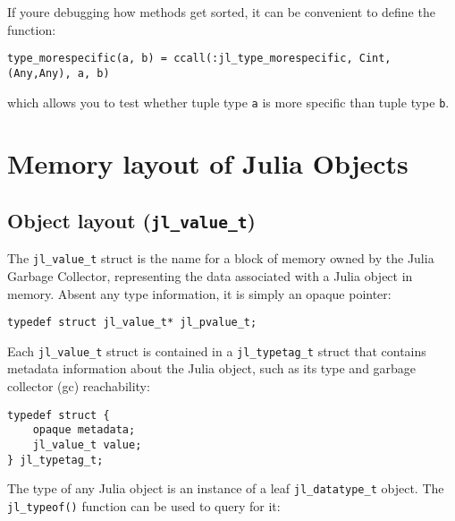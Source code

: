 If you{\textquotesingle}re debugging how methods get sorted, it can be convenient to define the function:




\begin{verbatim}
type_morespecific(a, b) = ccall(:jl_type_morespecific, Cint, (Any,Any), a, b)
\end{verbatim}



which allows you to test whether tuple type \texttt{a} is more specific than tuple type \texttt{b}.



\hypertarget{5831288113328207392}{}


\section{Memory layout of Julia Objects}



\hypertarget{9050896398576860708}{}


\subsection{Object layout (\texttt{jl\_value\_t})}



The \texttt{jl\_value\_t} struct is the name for a block of memory owned by the Julia Garbage Collector, representing the data associated with a Julia object in memory. Absent any type information, it is simply an opaque pointer:




\begin{lstlisting}
typedef struct jl_value_t* jl_pvalue_t;
\end{lstlisting}



Each \texttt{jl\_value\_t} struct is contained in a \texttt{jl\_typetag\_t} struct that contains metadata information about the Julia object, such as its type and garbage collector (gc) reachability:




\begin{lstlisting}
typedef struct {
    opaque metadata;
    jl_value_t value;
} jl_typetag_t;
\end{lstlisting}



The type of any Julia object is an instance of a leaf \texttt{jl\_datatype\_t} object. The \texttt{jl\_typeof()} function can be used to query for it:




